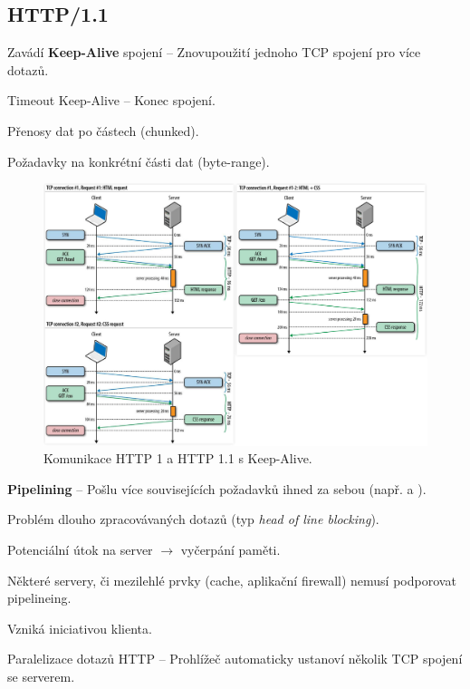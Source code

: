 \subsection{HTTP/1.1}

\begin{compactitem}
    \item Zavádí \textbf{Keep-Alive} spojení -- Znovupoužití jednoho TCP spojení pro více dotazů. \begin{compactitem}
        \item Timeout Keep-Alive -- Konec spojení.
    \end{compactitem}
    \item Přenosy dat po částech (chunked).
    \item Požadavky na konkrétní části dat (byte-range).

    \begin{figure}[H]
        \centering
        \includegraphics[width=1\linewidth]{http_keep_alive.pdf}
        \caption{Komunikace HTTP 1 a HTTP 1.1 s Keep-Alive.}
    \end{figure}

    \item \textbf{Pipelining} -- Pošlu více souvisejících požadavků ihned za sebou (např.  a ). \begin{compactitem}
        \item Problém dlouho zpracovávaných dotazů (typ \textit{head of line blocking}).
        \item Potenciální útok na server $\rightarrow$ vyčerpání paměti.
        \item Některé servery, či mezilehlé prvky (cache, aplikační firewall) nemusí podporovat pipelineing.
        \item Vzniká iniciativou klienta.
    \end{compactitem}

    \item Paralelizace dotazů HTTP -- Prohlížeč automaticky ustanoví několik TCP spojení se serverem.
\end{compactitem}

